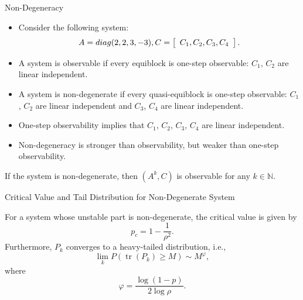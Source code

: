 \documentclass[10pt]{beamer}
\DeclareMathOperator{\1}{\textbf{1}}
\DeclareMathOperator{\tr}{tr}
\begin{document}
  \begin{frame}{Non-Degeneracy}
    \begin{itemize}
      \item Consider the following system: 
	\begin{displaymath}
	  \begin{split}
	    A = diag(2,2,3,-3), C = \left[ {\begin{array}{*{20}c}
	      C_1,C_2,C_3,C_4
	    \end{array}} \right].
	  \end{split}
	\end{displaymath}
      \item A system is observable if every equiblock is one-step observable: $C_1$, $C_2$ are linear independent.
      \item A system is non-degenerate if every quasi-equiblock is one-step observable: $C_1$, $C_2$ are linear independent and $C_3$, $C_4$ are linear independent.
      \item One-step observability implies that $C_1$, $C_2$, $C_3$, $C_4$ are linear independent.
      \item Non-degeneracy is stronger than observability, but weaker than one-step observability. 
    \end{itemize}
    \begin{theorem}
      If the system is non-degenerate, then $(A^k,C)$ is observable for any $k\in \mathbb N$. 
    \end{theorem}
  \end{frame}

  \begin{frame}{Critical Value and Tail Distribution for Non-Degenerate System}
    \begin{theorem}
      For a system whose unstable part is non-degenerate, the critical value is given by
      \begin{displaymath}
	p_c = 1-\frac{1}{\rho^2}.
      \end{displaymath}
      Furthermore, $P_k$ converges to a heavy-tailed distribution, i.e.,
      \begin{displaymath}
	\lim_k P(\tr(P_k)\geq M) \sim M^\varphi,
      \end{displaymath}
      where 
      \begin{displaymath}
	\varphi = \frac{\log(1-p)}{2\log \rho}.	
      \end{displaymath}
    \end{theorem}
  \end{frame}
\end{document}
